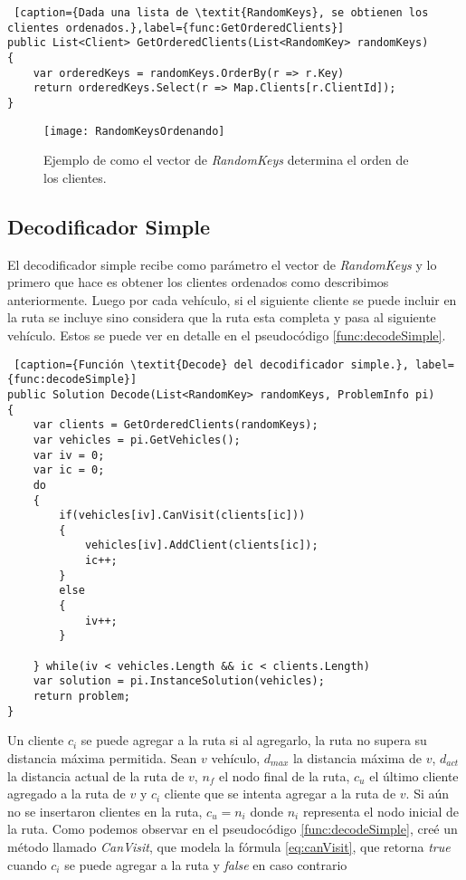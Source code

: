 \bigskip

\begin{minipage}{\linewidth}
\begin{lstlisting} [caption={Dada una lista de \textit{RandomKeys}, se obtienen los clientes ordenados.},label={func:GetOrderedClients}]
public List<Client> GetOrderedClients(List<RandomKey> randomKeys)
{        
	var orderedKeys = randomKeys.OrderBy(r => r.Key)
	return orderedKeys.Select(r => Map.Clients[r.ClientId]);
}
\end{lstlisting}
\end{minipage}

\begin{figure}[h]
	\caption{Ejemplo de como el vector de \textit{RandomKeys} determina el orden de los clientes.}
	\centering
	\texttt{[image: RandomKeysOrdenando]}
	\label{fig:RandomKeysOrdenando}
\end{figure}

\subsection{Decodificador Simple}

El decodificador simple recibe como parámetro el vector de \textit{RandomKeys} y lo primero que hace es obtener los clientes ordenados como describimos anteriormente. Luego por cada vehículo, si el siguiente cliente se puede incluir en la ruta se incluye sino considera que la ruta esta completa y pasa al siguiente vehículo. Estos se puede ver en detalle en el pseudocódigo \ref{func:decodeSimple}. 

\bigskip

\begin{minipage}{\linewidth}
\begin{lstlisting} [caption={Función \textit{Decode} del decodificador simple.}, label={func:decodeSimple}]
public Solution Decode(List<RandomKey> randomKeys, ProblemInfo pi)
{
	var clients = GetOrderedClients(randomKeys);
	var vehicles = pi.GetVehicles();	
	var iv = 0;
	var ic = 0;	
	do
	{
		if(vehicles[iv].CanVisit(clients[ic]))
		{
			vehicles[iv].AddClient(clients[ic]);
			ic++;
		}
		else
		{
			iv++;			
		}
		
	} while(iv < vehicles.Length && ic < clients.Length)	
	var solution = pi.InstanceSolution(vehicles);
	return problem;
}
\end{lstlisting}
\end{minipage}

Un cliente $c_i$ se puede agregar a la ruta si al agregarlo, la ruta no supera su distancia máxima permitida. Sean $v$ vehículo, $d_{max}$ la distancia máxima de $v$, $d_{act}$ la distancia actual de la ruta de $v$, $n_f$ el nodo final de la ruta, $c_u$ el último cliente agregado a la ruta de $v$ y $c_i$ cliente que se intenta agregar a la ruta de $v$. Si aún no se insertaron clientes en la ruta, $c_u = n_i$ donde $n_i$ representa el nodo inicial de la ruta. Como podemos observar en el pseudocódigo \ref{func:decodeSimple}, creé un método llamado \textit{CanVisit}, que modela la fórmula \ref{eq:canVisit}, que retorna \textit{true} cuando $c_i$ se puede agregar a la ruta y \textit{false} en caso contrario


